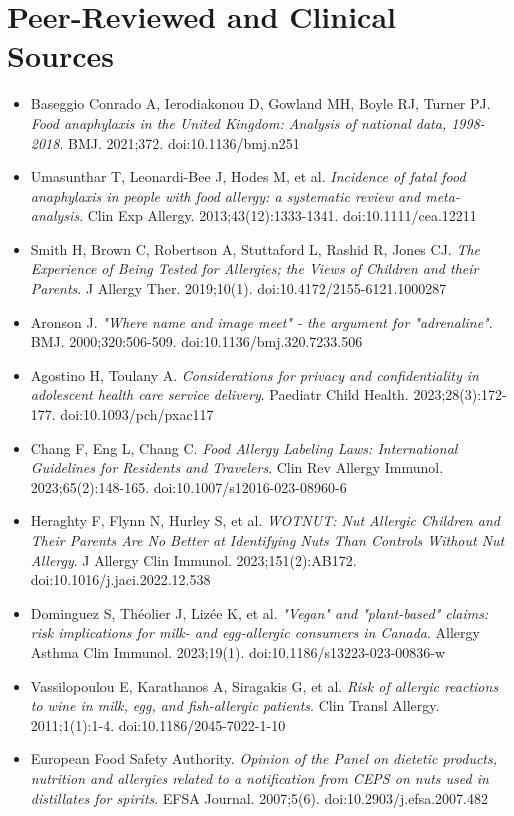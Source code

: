 \documentclass[MScCS]{uccthesis}
\begin{document}
\section*{Peer-Reviewed and Clinical Sources}
\begin{itemize}
    \item Baseggio Conrado A, Ierodiakonou D, Gowland MH, Boyle RJ, Turner PJ. \textit{Food anaphylaxis in the United Kingdom: Analysis of national data, 1998-2018}. BMJ. 2021;372. doi:10.1136/bmj.n251
    \item Umasunthar T, Leonardi-Bee J, Hodes M, et al. \textit{Incidence of fatal food anaphylaxis in people with food allergy: a systematic review and meta-analysis}. Clin Exp Allergy. 2013;43(12):1333-1341. doi:10.1111/cea.12211
    \item Smith H, Brown C, Robertson A, Stuttaford L, Rashid R, Jones CJ. \textit{The Experience of Being Tested for Allergies; the Views of Children and their Parents}. J Allergy Ther. 2019;10(1). doi:10.4172/2155-6121.1000287
    \item Aronson J. \textit{"Where name and image meet" - the argument for "adrenaline"}. BMJ. 2000;320:506-509. doi:10.1136/bmj.320.7233.506
    \item Agostino H, Toulany A. \textit{Considerations for privacy and confidentiality in adolescent health care service delivery}. Paediatr Child Health. 2023;28(3):172-177. doi:10.1093/pch/pxac117
    \item Chang F, Eng L, Chang C. \textit{Food Allergy Labeling Laws: International Guidelines for Residents and Travelers}. Clin Rev Allergy Immunol. 2023;65(2):148-165. doi:10.1007/s12016-023-08960-6
    \item Heraghty F, Flynn N, Hurley S, et al. \textit{WOTNUT: Nut Allergic Children and Their Parents Are No Better at Identifying Nuts Than Controls Without Nut Allergy}. J Allergy Clin Immunol. 2023;151(2):AB172. doi:10.1016/j.jaci.2022.12.538
    \item Dominguez S, Théolier J, Lizée K, et al. \textit{"Vegan" and "plant-based" claims: risk implications for milk- and egg-allergic consumers in Canada}. Allergy Asthma Clin Immunol. 2023;19(1). doi:10.1186/s13223-023-00836-w
    \item Vassilopoulou E, Karathanos A, Siragakis G, et al. \textit{Risk of allergic reactions to wine in milk, egg, and fish-allergic patients}. Clin Transl Allergy. 2011;1(1):1-4. doi:10.1186/2045-7022-1-10
    \item European Food Safety Authority. \textit{Opinion of the Panel on dietetic products, nutrition and allergies related to a notification from CEPS on nuts used in distillates for spirits}. EFSA Journal. 2007;5(6). doi:10.2903/j.efsa.2007.482

\end{itemize}
\end{document}
